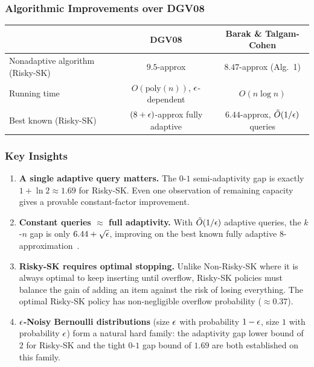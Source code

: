 \subsubsection{Algorithmic Improvements over DGV08}

\begin{center}
\begin{tabular}{l c c}
    \hline
    & DGV08 & Barak \& Talgam-Cohen \\
    \hline
    Nonadaptive algorithm (Risky-SK) & $9.5$-approx & $8.47$-approx (Alg.~1) \\
    Running time & $O(\mathrm{poly}(n))$, $\epsilon$-dependent & $O(n \log n)$ \\
    Best known (Risky-SK) & $(8+\epsilon)$-approx fully adaptive & $6.44$-approx, $\tilde{O}(1/\epsilon)$ queries \\
    \hline
\end{tabular}
\end{center}

\subsubsection{Key Insights}

\begin{enumerate}
    \item \textbf{A single adaptive query matters.} The $0$-$1$ semi-adaptivity gap is exactly $1 + \ln 2 \approx 1.69$ for Risky-SK. Even one observation of remaining capacity gives a provable constant-factor improvement.

    \item \textbf{Constant queries $\approx$ full adaptivity.} With $\tilde{O}(1/\epsilon)$ adaptive queries, the $k$-$n$ gap is only $6.44 + \sqrt{\epsilon}$, improving on the best known fully adaptive $8$-approximation~\cite{FLX18}.

    \item \textbf{Risky-SK requires optimal stopping.} Unlike Non-Risky-SK where it is always optimal to keep inserting until overflow, Risky-SK policies must balance the gain of adding an item against the risk of losing everything. The optimal Risky-SK policy has non-negligible overflow probability ($\approx 0.37$).

    \item \textbf{$\epsilon$-Noisy Bernoulli distributions} (size $\epsilon$ with probability $1-\epsilon$, size $1$ with probability $\epsilon$) form a natural hard family: the adaptivity gap lower bound of $2$ for Risky-SK and the tight $0$-$1$ gap bound of $1.69$ are both established on this family.
\end{enumerate}

